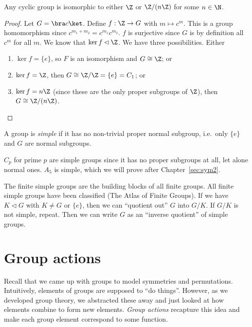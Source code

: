 \documentclass[a4paper]{article}
\begin{document}
\begin{lemma}
  Any cyclic group is isomorphic to either $\Z$ or $\Z/(n\Z)$ for some $n\in \N$.
\end{lemma}

\begin{proof}
  Let $G = \bra c\ket$. Define $f: \Z \to G$ with $m\mapsto c^m$. This is a group homomorphism since $c^{m_1 + m_2} = c^{m_1}c^{m_2}$. $f$ is surjective since $G$ is by definition all $c^m$ for all $m$. We know that $\ker f\lhd \Z$. We have three possibilities. Either
  \begin{enumerate}
    \item $\ker f = \{e\}$, so $F$ is an isomorphism and $G\cong \Z$; or
    \item $\ker f = \Z$, then $G\cong \Z/\Z = \{e\} = C_1$; or
    \item $\ker f = n\Z$ (since these are the only proper subgroups of $\Z$), then $G\cong \Z/(n\Z)$.
  \end{enumerate}
\end{proof}

\begin{defi}
  A group is \emph{simple} if it has no non-trivial proper normal subgroup, i.e.\ only $\{e\}$ and $G$ are normal subgroups.
\end{defi}

\begin{eg}
  $C_p$ for prime $p$ are simple groups since it has no proper subgroups at all, let alone normal ones.
  $A_5$ is simple, which we will prove after Chapter~\ref{sec:sym2}.
\end{eg}

The finite simple groups are the building blocks of all finite groups. All finite simple groups have been classified (The Atlas of Finite Groups). If we have $K\lhd G$ with $K\not= G$ or $\{e\}$, then we can ``quotient out'' $G$ into $G/K$. If $G/K$ is not simple, repeat. Then we can write $G$ as an ``inverse quotient'' of simple groups.

\section{Group actions}
\label{sec:action}
Recall that we came up with groups to model symmetries and permutations. Intuitively, elements of groups are supposed to ``do things''. However, as we developed group theory, we abstracted these away and just looked at how elements combine to form new elements. \emph{Group actions} recapture this idea and make each group element correspond to some function.
\end{document}
